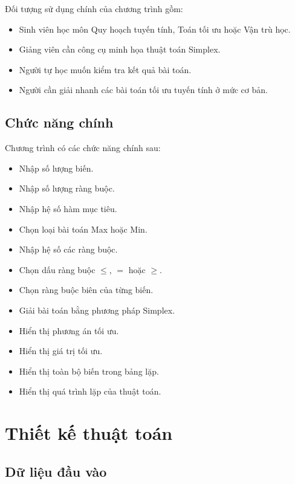 \documentclass[14pt, a4paper]{extarticle}
\begin{document}
    Đối tượng sử dụng chính của chương trình gồm:
    
    \begin{itemize}
        \item Sinh viên học môn Quy hoạch tuyến tính, Toán tối ưu hoặc Vận trù học.
        \item Giảng viên cần công cụ minh họa thuật toán Simplex.
        \item Người tự học muốn kiểm tra kết quả bài toán.
        \item Người cần giải nhanh các bài toán tối ưu tuyến tính ở mức cơ bản.
    \end{itemize}
    
    \subsection{Chức năng chính}
    
    Chương trình có các chức năng chính sau:
    
    \begin{itemize}
        \item Nhập số lượng biến.
        \item Nhập số lượng ràng buộc.
        \item Nhập hệ số hàm mục tiêu.
        \item Chọn loại bài toán Max hoặc Min.
        \item Nhập hệ số các ràng buộc.
        \item Chọn dấu ràng buộc $\leq$, $=$ hoặc $\geq$.
        \item Chọn ràng buộc biên của từng biến.
        \item Giải bài toán bằng phương pháp Simplex.
        \item Hiển thị phương án tối ưu.
        \item Hiển thị giá trị tối ưu.
        \item Hiển thị toàn bộ biến trong bảng lặp.
        \item Hiển thị quá trình lặp của thuật toán.
    \end{itemize}
    
    \section{Thiết kế thuật toán}
    
    \subsection{Dữ liệu đầu vào}
    
\end{document}
